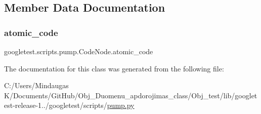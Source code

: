 \subsection{Member Data Documentation}
\mbox{\label{classgoogletest_1_1scripts_1_1pump_1_1_code_node_ae148adbd428fa1f4ea7c8a522e9718ab}} 
\subsubsection{\texorpdfstring{atomic\_code}{atomic\_code}}
{\footnotesize\ttfamily googletest.\+scripts.\+pump.\+Code\+Node.\+atomic\+\_\+code}



The documentation for this class was generated from the following file\+:\begin{DoxyCompactItemize}
\item 
C\+:/\+Users/\+Mindaugas K/\+Documents/\+Git\+Hub/\+Obj\+\_\+\+Duomenu\+\_\+apdorojimas\+\_\+class/\+Obj\+\_\+test/lib/googletest-\/release-\/1../googletest/scripts/\mbox{\hyperlink{_obj__test_2lib_2googletest-release-1_88_81_2googletest_2scripts_2pump_8py}{pump.\+py}}\end{DoxyCompactItemize}
